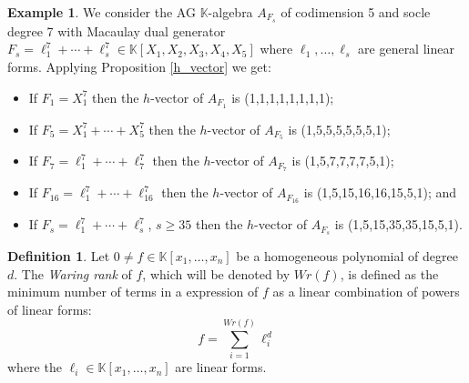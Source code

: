 \documentclass[12pt,twoside]{amsart}
\numberwithin{equation}{section} \hyphenation{semi-stable}
\newcommand{\K}{\mathbb{K}}
\theoremstyle{definition}
\newtheorem{definition}[theorem]{Definition}
\newtheorem{example}[theorem]{Example}
\begin{document}
\begin{example}
We  consider the AG $\K$-algebra $A_{F_s}$ of codimension 5 and socle degree 7 with Macaulay dual generator $F_s=\ell_1^7+\cdots +\ell_s^7\in \K [X_1,X_2,X_3,X_4,X_5]$ where $\ell_1, \ldots ,\ell_s$ are general linear forms. Applying Proposition \ref{h_vector} we get:

\vskip 2mm
\begin{itemize}
    
\item[(i)] If $F_1=X_1^7$ then the $h$-vector of  $A_{F_1}$ is  (1,1,1,1,1,1,1,1);

\item[(ii)] If $F_5=X_1^7+\cdots +X_5^7$ then the $h$-vector of  $A_{F_5}$ is  (1,5,5,5,5,5,5,1);

\item[(iii)] If $F_7=\ell _1^7+\cdots +\ell_7^7$ then the $h$-vector of  $A_{F_7}$ is  (1,5,7,7,7,7,5,1);

\item[(iv)]  If $F_{16}=\ell _1^7+\cdots +\ell_{16}^7$ then the $h$-vector of  $A_{F_{16}}$ is  (1,5,15,16,16,15,5,1); and

\item[(v)]  If $F_s=\ell _1^7+\cdots +\ell_s^7$, $s\ge 35$ then the $h$-vector of  $A_{F_s}$ is  (1,5,15,35,35,15,5,1).
\end{itemize}
\end{example}

\begin{definition} \label{def_wr}
    Let $0 \ne  f \in \K[x_1,\ldots, x_n]$ be a homogeneous polynomial of degree $d$.
The {\em Waring rank} of $f$, which will be denoted by $Wr(f)$, is defined as the minimum number
of terms in a expression of $f$ as a linear combination of powers of linear forms:
$$f =\sum _{i=1}^{Wr(f)} \ell _i^d
$$
where the $\ell_i \in \K[x_1,\ldots, x_n]$ are linear forms.
\end{definition}
\end{document}
